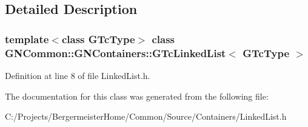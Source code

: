 \subsection{Detailed Description}
\subsubsection*{template$<$class G\+Tc\+Type$>$\newline
class G\+N\+Common\+::\+G\+N\+Containers\+::\+G\+Tc\+Linked\+List$<$ G\+Tc\+Type $>$}



Definition at line 8 of file Linked\+List.\+h.



The documentation for this class was generated from the following file\+:\begin{DoxyCompactItemize}
\item 
C\+:/\+Projects/\+Bergermeister\+Home/\+Common/\+Source/\+Containers/Linked\+List.\+h\end{DoxyCompactItemize}
